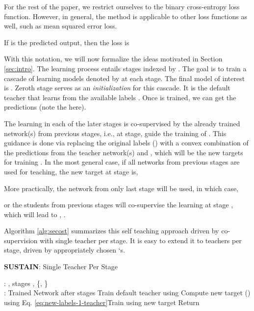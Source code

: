 \documentclass{article}
\begin{document}
For the rest of the paper, we restrict ourselves to the binary cross-entropy loss function. However, in general, the method is applicable to other loss functions as well, such as mean squared error loss. 

If  is the predicted output, then the loss is




With this notation, we will now formalize the ideas motivated in Section \ref{sec:intro}.
The learning process entails  stages indexed by . 
The goal is to train a cascade of learning models denoted by  at each stage. 
The final model of interest is . 
Zeroth stage serves as an {\it initialization} for this cascade. 
It is the default teacher that learns from the available labels . Once  is trained, we can get the predictions  (note the  here). 

The learning in each of the later stages is co-supervised by the already trained network(s) from previous stages, 
i.e., at  stage,  guide the training of . 
This guidance is done via replacing the original labels () with a convex combination of the predictions from the teacher network(s) and , which will be the new targets for training . 
In the most general case, if all networks from previous stages are used for teaching, the new target at  stage is, 



More practically, the network from only last stage will be used, in which case, 

or the students from previous  stages will co-supervise the learning at stage , which will lead to ,  . 

Algorithm \ref{alg:secost} summarizes this self teaching approach driven by co-supervision with single teacher per stage. It is easy to extend it to  teachers per stage, driven by appropriately chosen `s. 

\setlength{\textfloatsep}{5pt}
\begin{algorithm}[t!]
	\caption{\textbf{SUSTAIN}: Single Teacher Per Stage}
	\begin{algorithmic}[1]
		\REQUIRE: , stages , \{,  \} \\
		\ENSURE: Trained Network  after  stages
		\STATE Train default teacher  using   
		\FOR{}
		\STATE Compute new target  () using Eq. \ref{eq:new-labels-1-teacher}\STATE Train  using new target   
		\ENDFOR
		\STATE Return 
	\end{algorithmic}
	\label{alg:secost}
\end{algorithm}
\end{document}
